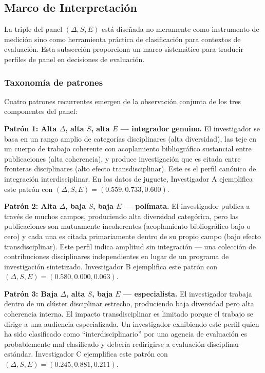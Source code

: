 \documentclass[
]{article}
\begin{document}
\hypertarget{marco-de-interpretaciuxf3n}{%
\subsection{Marco de Interpretación}\label{marco-de-interpretaciuxf3n}}

La triple del panel \((\Delta, S, E)\) está diseñada no meramente como
instrumento de medición sino como herramienta práctica de clasificación
para contextos de evaluación. Esta subsección proporciona un marco
sistemático para traducir perfiles de panel en decisiones de evaluación.

\hypertarget{taxonomuxeda-de-patrones}{%
\subsubsection{Taxonomía de patrones}\label{taxonomuxeda-de-patrones}}

Cuatro patrones recurrentes emergen de la observación conjunta de los
tres componentes del panel:

\textbf{Patrón 1: Alta \(\Delta\), alta \(S\), alta \(E\) --- integrador
genuino.} El investigador se basa en un rango amplio de categorías
disciplinares (alta diversidad), las teje en un cuerpo de trabajo
coherente con acoplamiento bibliográfico sustancial entre publicaciones
(alta coherencia), y produce investigación que es citada entre fronteras
disciplinares (alto efecto transdisciplinar). Este es el perfil canónico
de integración interdisciplinar. En los datos de juguete, Investigador A
ejemplifica este patrón con \((\Delta, S, E) = (0.559, 0.733, 0.600)\).

\textbf{Patrón 2: Alta \(\Delta\), baja \(S\), baja \(E\) --- polímata.}
El investigador publica a través de muchos campos, produciendo alta
diversidad categórica, pero las publicaciones son mutuamente
incoherentes (acoplamiento bibliográfico bajo o cero) y cada una es
citada primariamente dentro de su propio campo (bajo efecto
transdisciplinar). Este perfil indica amplitud sin integración --- una
colección de contribuciones disciplinares independientes en lugar de un
programa de investigación sintetizado. Investigador B ejemplifica este
patrón con \((\Delta, S, E) = (0.580, 0.000, 0.063)\).

\textbf{Patrón 3: Baja \(\Delta\), alta \(S\), baja \(E\) ---
especialista.} El investigador trabaja dentro de un clúster disciplinar
estrecho, produciendo baja diversidad pero alta coherencia interna. El
impacto transdisciplinar es limitado porque el trabajo se dirige a una
audiencia especializada. Un investigador exhibiendo este perfil quien ha
sido clasificado como ``interdisciplinario'' por una agencia de
evaluación es probablemente mal clasificado y debería redirigirse a
evaluación disciplinar estándar. Investigador C ejemplifica este patrón
con \((\Delta, S, E) = (0.245, 0.881, 0.211)\).
\end{document}
